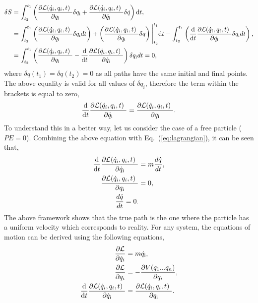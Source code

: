 \documentclass[a4paper]{article}
\begin{document}
\begin{equation}\label{eq:leastaction}
\begin{split}
\delta S&=\int^{t_{1}}_{t_{2}}\left(\frac{\partial\mathcal{L}(\dot{q}_{i},q_{i},t)~}{\partial q_{\rm i}}\delta q_{\rm i}+\frac{\partial\mathcal{L}(\dot{q}_{i},q_{i},t)~}{\partial \dot{q}_{\rm i}}\delta \dot{q}\right){\rm d}t,\\
&=\int^{t_{1}}_{t_{2}}\left(\frac{\partial\mathcal{L}(\dot{q}_{i},q_{i},t)~}{\partial q_{\rm i}}\delta q_{\rm i}dt\right) +\left(\frac{\partial\mathcal{L}(\dot{q}_{i},q_{i},t)~}{\partial {q}_{\rm i}}\delta {q}\right)\Bigg|^{t_{1}}_{t_{2}}{\rm d}t-\int^{t_{1}}_{t_{2}}\left(\frac{\rm d}{{\rm d}t}\frac{\partial\mathcal{L}(\dot{q}_{i},q_{i},t)~}{\partial \dot{q}_{\rm i}}\delta q_{\rm i}dt\right),\\
&=\int^{t_{1}}_{t_{2}}\left(\frac{\partial\mathcal{L}(\dot{q}_{i},q_{i},t)~}{\partial q_{\rm i}} - \frac{\rm d}{{\rm d}t}\frac{\partial\mathcal{L}(\dot{q}_{i},q_{i},t)~}{\partial \dot{q}_{\rm i}}\right)\delta q_{\rm i}dt=0,\\
\end{split}
\end{equation}
where $\delta q(t_{1})=\delta q(t_{2})=0$ as all paths have the same initial and final points. The above equality is valid for all values of $\delta q_{i}$, therefore the term within the brackets is equal to zero,
\begin{equation}
\frac{\rm d}{{\rm d}t}\frac{\partial\mathcal{L}(\dot{q}_{i},q_{i},t)~}{\partial \dot{q}_{\rm i}}=\frac{\partial\mathcal{L}(\dot{q}_{i},q_{i},t)~}{\partial q_{\rm i}}.
\end{equation}
To understand this in a better way, let us consider the case of a free particle ($PE=0$). Combining the above equation with Eq.~(\ref{eq:lagrangian}), it can be seen that,
\begin{equation}
\begin{split}
\frac{\rm d}{{\rm d}t}\frac{\partial\mathcal{L}(\dot{q}_{i},q_{i},t)~}{\partial \dot{q}_{\rm i}}&=m\frac{d\dot{q}}{dt},\\
\frac{\partial\mathcal{L}(\dot{q}_{i},q_{i},t)~}{\partial q_{\rm i}}&=0,\\
\frac{d\dot{q}}{dt}=0.
\end{split}
\end{equation}
The above framework shows that the true path is the one where the particle has a uniform velocity which corresponds to reality. For any system, the equations of motion can be derived using the following equations,
\begin{equation}\label{eq:equationsmotion}
\begin{split}
\frac{\partial \mathcal{L}}{\partial \dot{q}_{i}}&=m\dot{q}_{\rm i},\\\frac{\partial \mathcal{L}}{\partial q_{i}}&=-\frac{\partial V(q_{1}...q_{n})}{\partial q_{i}},\\
\frac{\rm d}{{\rm d}t}\frac{\partial\mathcal{L}(\dot{q}_{i},q_{i},t)~}{\partial \dot{q}_{\rm i}}&=\frac{\partial\mathcal{L}(\dot{q}_{i},q_{i},t)~}{\partial q_{\rm i}}.
\end{split}
\end{equation} 
\end{document}
